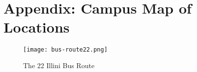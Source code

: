 \section{Appendix: Campus Map of Locations}

\begin{figure}[H]
	\centering
	\texttt{[image: bus-route22.png]}
	\caption{The 22 Illini Bus Route}
\end{figure}